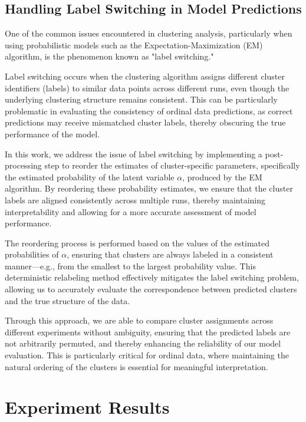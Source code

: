 \documentclass{article}
\begin{document}
\subsection{Handling Label Switching in Model Predictions}

One of the common issues encountered in clustering analysis, 
particularly when using probabilistic models such as the Expectation-Maximization (EM) algorithm, 
is the phenomenon known as "label switching." 

Label switching occurs when the clustering algorithm assigns different cluster identifiers (labels) to similar data points across different runs, 
even though the underlying clustering structure remains consistent. 
This can be particularly problematic in evaluating the consistency of ordinal data predictions, 
as correct predictions may receive mismatched cluster labels, 
thereby obscuring the true performance of the model.

In this work, we address the issue of label switching by implementing a post-processing step to reorder the estimates of cluster-specific parameters, 
specifically the estimated probability of the latent variable 
$\alpha$, produced by the EM algorithm. By reordering these probability estimates, 
we ensure that the cluster labels are aligned consistently across multiple runs, 
thereby maintaining interpretability and allowing for a more accurate assessment of model performance.

The reordering process is performed based on the values of the estimated probabilities of 
$\alpha$, ensuring that clusters are always labeled in a consistent manner—e.g., 
from the smallest to the largest probability value. 
This deterministic relabeling method effectively mitigates the label switching problem, 
allowing us to accurately evaluate the correspondence between predicted clusters and the true structure of the data.

Through this approach, we are able to compare cluster assignments across different experiments without ambiguity, 
ensuring that the predicted labels are not arbitrarily permuted, and thereby enhancing the reliability of our model evaluation. 
This is particularly critical for ordinal data, where maintaining the natural ordering of the clusters is essential for meaningful interpretation.


\section{Experiment Results}
\end{document}
